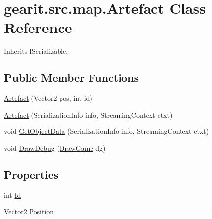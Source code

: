 \hypertarget{classgearit_1_1src_1_1map_1_1_artefact}{\section{gearit.\+src.\+map.\+Artefact Class Reference}
\label{classgearit_1_1src_1_1map_1_1_artefact}
}


Inherits I\+Serializable.

\subsection*{Public Member Functions}
\begin{DoxyCompactItemize}
\item 
\hyperlink{classgearit_1_1src_1_1map_1_1_artefact_a19023046a280c9c1ca87f76ceea87b4a}{Artefact} (Vector2 pos, int id)
\item 
\hyperlink{classgearit_1_1src_1_1map_1_1_artefact_aff547188072d614ed5040cb72134db6f}{Artefact} (Serialization\+Info info, Streaming\+Context ctxt)
\item 
void \hyperlink{classgearit_1_1src_1_1map_1_1_artefact_a0d6e78e4ae3b79b98cae59e6b562aa7b}{Get\+Object\+Data} (Serialization\+Info info, Streaming\+Context ctxt)
\item 
void \hyperlink{classgearit_1_1src_1_1map_1_1_artefact_a6cd379337f43ad4884e52899fb733e7f}{Draw\+Debug} (\hyperlink{classgearit_1_1src_1_1_draw_game}{Draw\+Game} dg)
\end{DoxyCompactItemize}
\subsection*{Properties}
\begin{DoxyCompactItemize}
\item 
int \hyperlink{classgearit_1_1src_1_1map_1_1_artefact_a47218e1d5629a09d6f9ee094b362fe05}{Id}
\item 
Vector2 \hyperlink{classgearit_1_1src_1_1map_1_1_artefact_ad00862e22dc51f3ddeefa1fd2b2ba124}{Position}
\end{DoxyCompactItemize}


